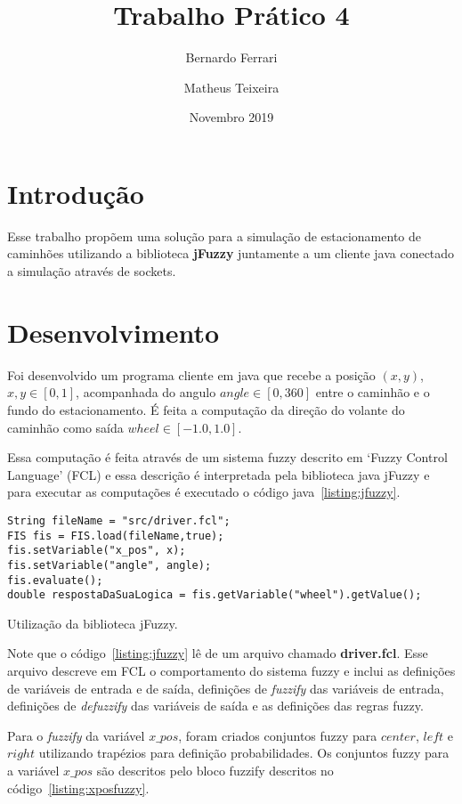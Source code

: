 \documentclass[12pt, a4paper]{article}
\title{Trabalho Prático 4}
\author{Bernardo Ferrari \and Matheus Teixeira}
\date{Novembro 2019}
\begin{document}
\maketitle

\section{Introdução}

Esse trabalho propõem uma solução para a simulação de estacionamento de
caminhões utilizando a biblioteca \textbf{jFuzzy} juntamente a um cliente
java conectado a simulação através de sockets.

\section{Desenvolvimento}

Foi desenvolvido um programa cliente em java que recebe a posição $(x, y)$, $x, y \in [0, 1]$,
acompanhada do angulo $angle \in [0, 360]$ entre o caminhão e o fundo do estacionamento.
É feita a computação da direção do volante do caminhão como saída $wheel \in [-1.0, 1.0]$.

Essa computação é feita através de um sistema fuzzy descrito em `Fuzzy Control Language' (FCL) e
essa descrição é interpretada pela biblioteca java jFuzzy e para executar as computações é executado
o código java~\ref{listing:jfuzzy}.

\begin{listing}[h!]
  \begin{verbatim}
String fileName = "src/driver.fcl";
FIS fis = FIS.load(fileName,true);
fis.setVariable("x_pos", x);
fis.setVariable("angle", angle);
fis.evaluate();
double respostaDaSuaLogica = fis.getVariable("wheel").getValue();
  \end{verbatim}
  \caption{Utilização da biblioteca jFuzzy.}\label{listing:jfuzzy}
\end{listing}

Note que o código~\ref{listing:jfuzzy} lê de um arquivo chamado \textbf{driver.fcl}.
Esse arquivo descreve em FCL o comportamento do sistema fuzzy e inclui as definições
de variáveis de entrada e de saída, definições de \textit{fuzzify} das variáveis de entrada,
definições de \textit{defuzzify} das variáveis de saída e as definições das regras fuzzy.

Para o \textit{fuzzify} da variável $x\_pos$, foram criados conjuntos fuzzy para $center$, $left$ e $right$ utilizando trapézios para definição probabilidades.
Os conjuntos fuzzy para a variável $x\_pos$ são descritos pelo bloco fuzzify descritos no código~\ref{listing:xposfuzzy}.
\end{document}
